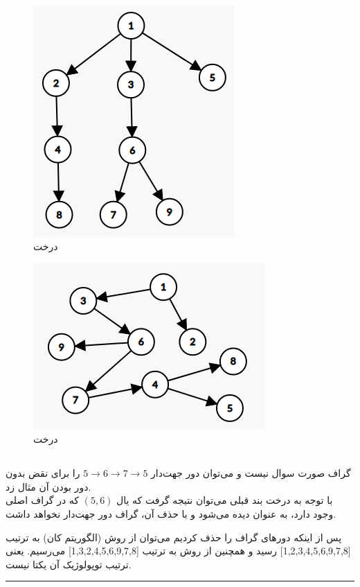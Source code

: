 \documentclass{article}
\begin{document}
\begin{multicols}{2}
\subsection*{}
\begin{figure}[H]
    \center
    \includegraphics[width=0.45\linewidth]{Photos/HW2/bfs2.png}
    \caption{
    درخت
    }
    \label{fig:my_label}
\end{figure}

\begin{figure}[H]
    \center
    \includegraphics[width=0.5\linewidth]{Photos/HW2/backedge.png}
    \caption{
    درخت
    }
    \label{fig:my_label}
\end{figure}
\subsection*{}
گراف صورت سوال
نیست و می‌توان دور جهت‌دار
$5 \rightarrow 6 \rightarrow 7 \rightarrow 5$
را برای نقض بدون دور بودن آن مثال زد.\\
با توجه به درخت
بند قبلی می‌توان نتیجه گرفت که یال
$(5, 6)$
که در گراف اصلی وجود دارد، به عنوان
دیده می‌شود و با حذف آن، گراف دور جهت‌دار نخواهد داشت.

پس از اینکه دورهای گراف را حذف کردیم می‌توان از روش
(الگوریتم کان) به ترتیب
[1,2,3,4,5,6,9,7,8]
رسید و همچنین از روش
به ترتیب
[1,3,2,4,5,6,9,7,8]
می‌رسیم. یعنی ترتیب توپولوژیک آن یکتا نیست.\\
\rule{\linewidth}{1pt}


\end{multicols}
\end{document}
